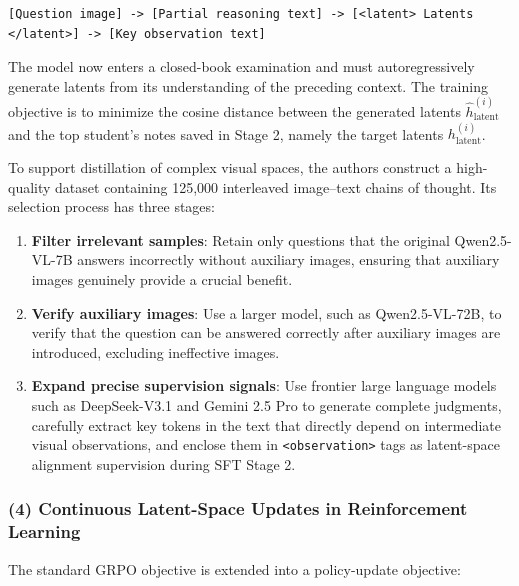 \begin{verbatim}
[Question image] -> [Partial reasoning text] -> [<latent> Latents </latent>] -> [Key observation text]
\end{verbatim}

The model now enters a closed-book examination and must autoregressively generate latents from its understanding of the preceding context. The training objective is to minimize the cosine distance between the generated latents \(\hat h_{\text{latent}}^{(i)}\) and the top student's notes saved in Stage 2, namely the target latents \(h_{\text{latent}}^{(i)}\).

To support distillation of complex visual spaces, the authors construct a high-quality dataset containing 125,000 interleaved image--text chains of thought. Its selection process has three stages:

\begin{enumerate}
\def\labelenumi{\arabic{enumi}.}
\tightlist
\item
  \textbf{Filter irrelevant samples}: Retain only questions that the original Qwen2.5-VL-7B answers incorrectly without auxiliary images, ensuring that auxiliary images genuinely provide a crucial benefit.
\item
  \textbf{Verify auxiliary images}: Use a larger model, such as Qwen2.5-VL-72B, to verify that the question can be answered correctly after auxiliary images are introduced, excluding ineffective images.
\item
  \textbf{Expand precise supervision signals}: Use frontier large language models such as DeepSeek-V3.1 and Gemini 2.5 Pro to generate complete judgments, carefully extract key tokens in the text that directly depend on intermediate visual observations, and enclose them in \texttt{\textless{}observation\textgreater{}} tags as latent-space alignment supervision during SFT Stage 2.
\end{enumerate}

\hypertarget{continuous-latent-space-updates-in-reinforcement-learning}{%
\subsubsection{(4) Continuous Latent-Space Updates in Reinforcement Learning}\label{continuous-latent-space-updates-in-reinforcement-learning}}

The standard GRPO objective is extended into a policy-update objective:

